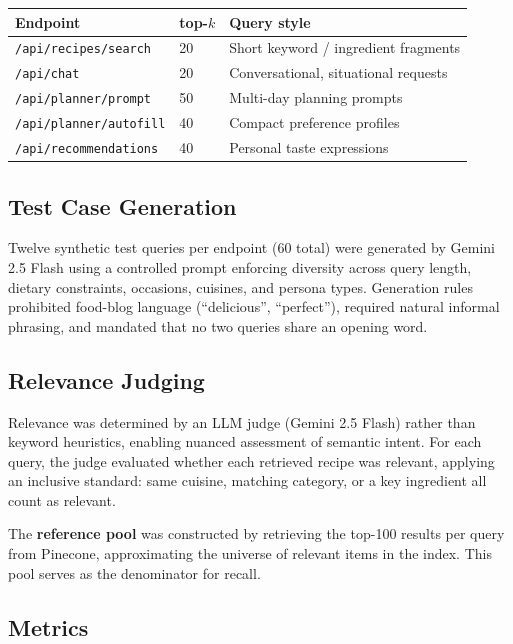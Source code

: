 \documentclass[12pt,letterpaper]{article}
\begin{document}
\begin{center}
\small
\begin{tabular}{L{4.5cm} C{2cm} L{6cm}}
  \toprule
  \textbf{Endpoint} & \textbf{top-$k$} & \textbf{Query style} \\
  \midrule
  \texttt{/api/recipes/search}    & 20 & Short keyword / ingredient fragments \\
  \texttt{/api/chat}              & 20 & Conversational, situational requests \\
  \texttt{/api/planner/prompt}    & 50 & Multi-day planning prompts \\
  \texttt{/api/planner/autofill}  & 40 & Compact preference profiles \\
  \texttt{/api/recommendations}   & 40 & Personal taste expressions \\
  \bottomrule
\end{tabular}
\end{center}

\subsection{Test Case Generation}

Twelve synthetic test queries per endpoint (60 total) were generated by Gemini 2.5 Flash
using a controlled prompt enforcing diversity across query length, dietary constraints,
occasions, cuisines, and persona types. Generation rules prohibited food-blog language
(``delicious'', ``perfect''), required natural informal phrasing, and mandated that no two
queries share an opening word.

\subsection{Relevance Judging}

Relevance was determined by an LLM judge (Gemini 2.5 Flash) rather than keyword
heuristics, enabling nuanced assessment of semantic intent. For each query, the judge
evaluated whether each retrieved recipe was relevant, applying an inclusive standard:
same cuisine, matching category, or a key ingredient all count as relevant.

The \textbf{reference pool} was constructed by retrieving the top-100 results per query from
Pinecone, approximating the universe of relevant items in the index. This pool serves as
the denominator for recall.

\subsection{Metrics}
\end{document}
